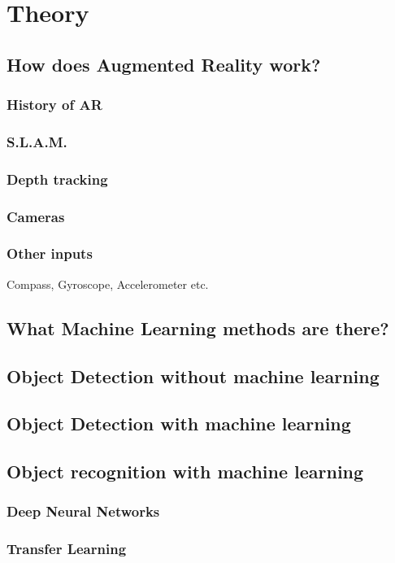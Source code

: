 \section{Theory}

\subsection{How does Augmented Reality work?}

\subsubsection{History of AR}

\subsubsection{S.L.A.M.}

\subsubsection{Depth tracking}

\subsubsection{Cameras}

\subsubsection{Other inputs}
Compass, Gyroscope, Accelerometer  etc.

\subsection{What Machine Learning methods are there?}

\subsection{Object Detection without machine learning}

\subsection{Object Detection with machine learning}

\subsection{Object recognition with machine learning}

\subsubsection{Deep Neural Networks}
\subsubsection{Transfer Learning}

\newpage
